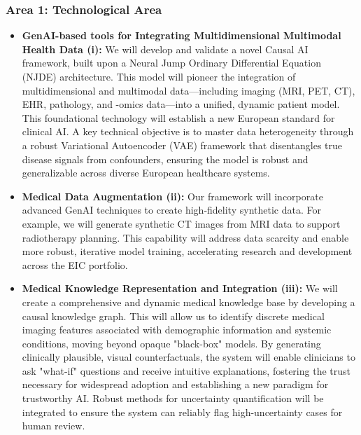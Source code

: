 \documentclass[11pt, a4paper]{article}
\begin{document}
\subsubsection*{Area 1: Technological Area}
\begin{itemize}
    \item \textbf{GenAI-based tools for Integrating Multidimensional Multimodal Health Data (i):} We will develop and validate a novel Causal AI framework, built upon a Neural Jump Ordinary Differential Equation (NJDE) architecture. This model will pioneer the integration of multidimensional and multimodal data—including imaging (MRI, PET, CT), EHR, pathology, and -omics data—into a unified, dynamic patient model. This foundational technology will establish a new European standard for clinical AI. A key technical objective is to master data heterogeneity through a robust Variational Autoencoder (VAE) framework that disentangles true disease signals from confounders, ensuring the model is robust and generalizable across diverse European healthcare systems.

    \item \textbf{Medical Data Augmentation (ii):} Our framework will incorporate advanced GenAI techniques to create high-fidelity synthetic data. For example, we will generate synthetic CT images from MRI data to support radiotherapy planning. This capability will address data scarcity and enable more robust, iterative model training, accelerating research and development across the EIC portfolio.

    \item \textbf{Medical Knowledge Representation and Integration (iii):} We will create a comprehensive and dynamic medical knowledge base by developing a causal knowledge graph. This will allow us to identify discrete medical imaging features associated with demographic information and systemic conditions, moving beyond opaque "black-box" models. By generating clinically plausible, visual counterfactuals, the system will enable clinicians to ask "what-if" questions and receive intuitive explanations, fostering the trust necessary for widespread adoption and establishing a new paradigm for trustworthy AI. Robust methods for uncertainty quantification will be integrated to ensure the system can reliably flag high-uncertainty cases for human review.
\end{itemize}
\end{document}
